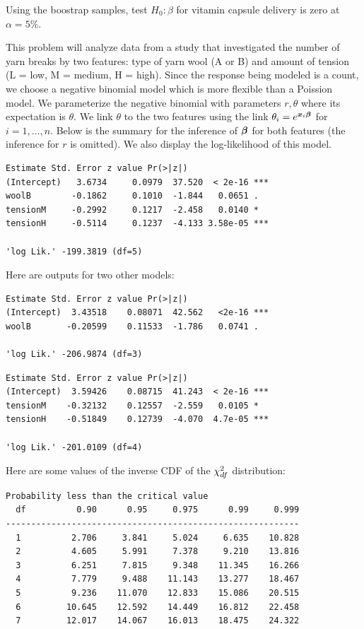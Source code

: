 \documentclass[12pt]{article}
\begin{document}
\begin{enumerate}[(a)]
 Using the boostrap samples, test $H_0: \beta$ for vitamin capsule delivery is zero at $\alpha = 5\%$. 


\end{enumerate}

\problem This problem will analyze data from a study that investigated the number of yarn breaks by two features: type of yarn wool (A or B) and amount of tension (L = low, M = medium, H = high). Since the response being modeled is a count, we choose a negative binomial model which is more flexible than a Poission model. We parameterize the negative binomial with parameters $r, \theta$ where its expectation is $\theta$. We link $\theta$ to the two features using the link $\theta_i = e^{\boldsymbol{x}_i \boldsymbol{\beta}}$ for $i = 1, \ldots, n$. Below is the summary for the inference of $\boldsymbol{\beta}$ for both features (the inference for $r$ is omitted). We also display the log-likelihood of this model.

\begin{Verbatim}[frame=single]
            Estimate Std. Error z value Pr(>|z|)    
(Intercept)   3.6734     0.0979  37.520  < 2e-16 ***
woolB        -0.1862     0.1010  -1.844   0.0651 .  
tensionM     -0.2992     0.1217  -2.458   0.0140 *  
tensionH     -0.5114     0.1237  -4.133 3.58e-05 ***

'log Lik.' -199.3819 (df=5)
\end{Verbatim}

\noindent Here are outputs for two other models:

\begin{Verbatim}[frame=single]
            Estimate Std. Error z value Pr(>|z|)    
(Intercept)  3.43518    0.08071  42.562   <2e-16 ***
woolB       -0.20599    0.11533  -1.786   0.0741 .  

'log Lik.' -206.9874 (df=3)
\end{Verbatim}

\begin{Verbatim}[frame=single]
            Estimate Std. Error z value Pr(>|z|)    
(Intercept)  3.59426    0.08715  41.243  < 2e-16 ***
tensionM    -0.32132    0.12557  -2.559   0.0105 *  
tensionH    -0.51849    0.12739  -4.070  4.7e-05 *** 

'log Lik.' -201.0109 (df=4)
\end{Verbatim}

\noindent Here are some values of the inverse CDF of the $\chi^2_{df}$ distribution:

\begin{Verbatim}[frame=single,fontsize=\footnotesize]
                Probability less than the critical value
  df          0.90      0.95     0.975      0.99     0.999
----------------------------------------------------------
  1          2.706     3.841     5.024     6.635    10.828
  2          4.605     5.991     7.378     9.210    13.816
  3          6.251     7.815     9.348    11.345    16.266
  4          7.779     9.488    11.143    13.277    18.467
  5          9.236    11.070    12.833    15.086    20.515
  6         10.645    12.592    14.449    16.812    22.458
  7         12.017    14.067    16.013    18.475    24.322
\end{Verbatim}
\end{document}
